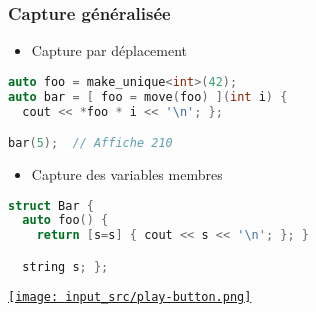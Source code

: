 \documentclass[C++.tex]{subfiles}
\begin{document}
\begin{frame}[fragile]
	\frametitle{Capture généralisée}
	\begin{itemize}
		\item Capture par déplacement
	\end{itemize}

	\begin{lstlisting}[language=C++]
auto foo = make_unique<int>(42);
auto bar = [ foo = move(foo) ](int i) {
  cout << *foo * i << '\n'; };

bar(5);  // Affiche 210\end{lstlisting}

	\begin{itemize}
		\item Capture des variables membres
	\end{itemize}

	\begin{lstlisting}[language=C++]
struct Bar {
  auto foo() {
    return [s=s] { cout << s << '\n'; }; }

  string s; };\end{lstlisting}

	\hfill
	\href{https://godbolt.org/#g:!((g:!((g:!((h:codeEditor,i:(filename:'1',fontScale:14,fontUsePx:'0',j:1,lang:c%2B%2B,selection:(endColumn:1,endLineNumber:16,positionColumn:1,positionLineNumber:16,selectionStartColumn:1,selectionStartLineNumber:8,startColumn:1,startLineNumber:8),source:'%23include+%3Ciostream%3E%0A%23include+%3Cstring%3E%0A%0Ausing+namespace+std::literals%3B%0A%0Aint+main()%0A%7B%0A++int+foo+%3D+42%3B%0A%0A++auto+bar+%3D+%5B+%26x+%3D+foo+%5D()+%7B+--x%3B+%7D%3B%0A++bar()%3B%0A++std::cout+%3C%3C+foo+%3C%3C+!'%5Cn!'%3B%0A%0A++auto+baz+%3D+%5B+y+%3D+2*foo+%5D()+%7B+std::cout+%3C%3C+y+%3C%3C+!'%5Cn!'%3B+%7D%3B%0A++baz()%3B%0A%7D%0A'),l:'5',n:'0',o:'C%2B%2B+source+%231',t:'0')),k:50,l:'4',n:'0',o:'',s:0,t:'0'),(g:!((h:executor,i:(argsPanelShown:'1',compilationPanelShown:'0',compiler:g122,compilerName:'',compilerOutShown:'0',execArgs:'',execStdin:'',fontScale:14,fontUsePx:'0',j:1,lang:c%2B%2B,libs:!((name:boost,ver:'175')),options:'-std%3Dc%2B%2B14+-Wall+-Wextra',source:1,stdinPanelShown:'1',tree:'1',wrap:'0'),l:'5',n:'0',o:'Executor+x86-64+gcc+12.2+(C%2B%2B,+Editor+%231)',t:'0')),header:(),k:50,l:'4',n:'0',o:'',s:0,t:'0')),l:'2',n:'0',o:'',t:'0')),version:4}{\texttt{[image: input\_src/play-button.png]}}
\end{frame}
\end{document}
